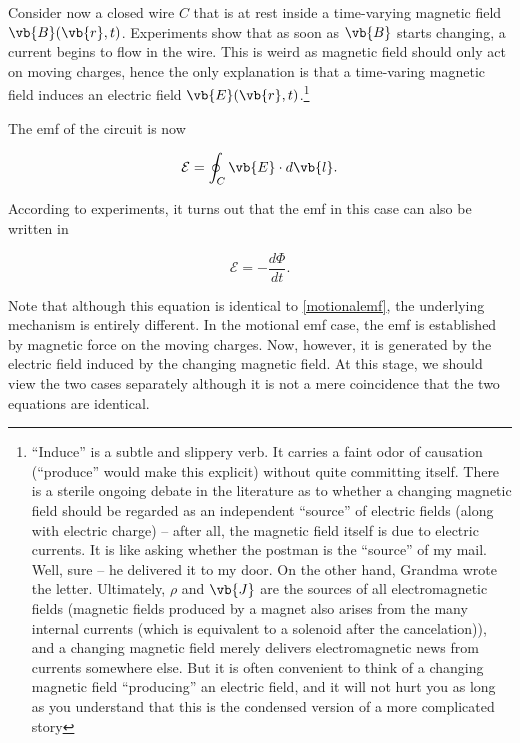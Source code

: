 \documentclass[english,a4paper,12pt]{report}
\begin{document}
Consider now a closed wire \(C\) that is at rest inside a time-varying magnetic field \(\vb{B} (\vb{r} ,t)\). Experiments show that as soon as \(\vb{B} \) starts changing, a current begins to flow in the wire. This is weird as magnetic field should only act on moving charges, hence the only explanation is that a time-varing magnetic field induces an electric field \(\vb{E} (\vb{r} ,t)\).\footnote{``Induce'' is a subtle and slippery verb. It carries a faint odor of causation (“produce” would make this explicit) without quite committing itself. There is a sterile ongoing debate in the literature as to whether a changing magnetic field should be regarded as an independent “source” of electric fields (along with electric charge) -- after all, the magnetic field itself is due to electric currents. It is like asking whether the postman is the “source” of my mail. Well, sure -- he delivered it to my door. On the other hand, Grandma wrote the letter. Ultimately, \(\rho \)  and \(\vb{J} \)  are the sources of all electromagnetic fields (magnetic fields produced by a magnet also arises from the many internal currents (which is equivalent to a solenoid after the cancelation)), and a changing magnetic field merely delivers electromagnetic news from currents somewhere else. But it is often convenient to think of a changing magnetic field “producing” an electric field, and it will not hurt you as long as you understand that this is the condensed version of a more complicated story}
 
The emf of the circuit is now

\begin{equation}
    \mathcal{E} = \oint_{C} \vb{E} \cdot d \vb{l}.
\end{equation}

According to experiments, it turns out that the emf in this case can also be written in

\begin{equation}
    \mathcal{E}= - \frac{d\Phi }{dt}.
\end{equation}

Note that although this equation is identical to \cref{motionalemf}, the underlying mechanism is entirely different. In the motional emf case, the emf is established by magnetic force on the moving charges. Now, however, it is generated by the electric field induced by the changing magnetic field. At this stage, we should view the two cases separately although it is not a mere coincidence that the two equations are identical.
\end{document}
